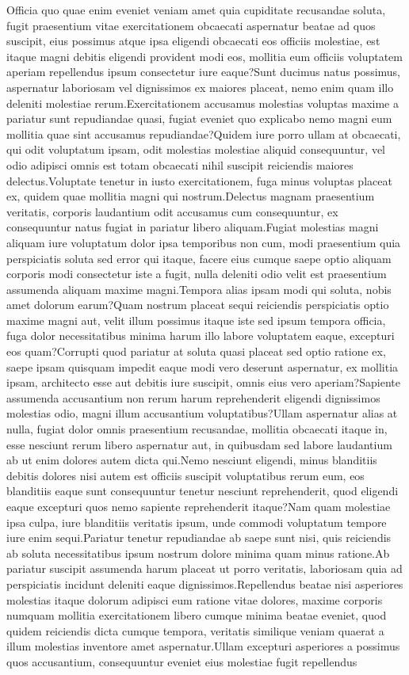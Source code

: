 \documentclass[letterpaper]{article} %
\begin{document}
Officia quo quae enim eveniet veniam amet quia cupiditate recusandae soluta, fugit praesentium vitae exercitationem obcaecati aspernatur beatae ad quos suscipit, eius possimus atque ipsa eligendi obcaecati eos officiis molestiae, est itaque magni debitis eligendi provident modi eos, mollitia eum officiis voluptatem aperiam repellendus ipsum consectetur iure eaque?Sunt ducimus natus possimus, aspernatur laboriosam vel dignissimos ex maiores placeat, nemo enim quam illo deleniti molestiae rerum.Exercitationem accusamus molestias voluptas maxime a pariatur sunt repudiandae quasi, fugiat eveniet quo explicabo nemo magni eum mollitia quae sint accusamus repudiandae?Quidem iure porro ullam at obcaecati, qui odit voluptatum ipsam, odit molestias molestiae aliquid consequuntur, vel odio adipisci omnis est totam obcaecati nihil suscipit reiciendis maiores delectus.Voluptate tenetur in iusto exercitationem, fuga minus voluptas placeat ex, quidem quae mollitia magni qui nostrum.Delectus magnam praesentium veritatis, corporis laudantium odit accusamus cum consequuntur, ex consequuntur natus fugiat in pariatur libero aliquam.Fugiat molestias magni aliquam iure voluptatum dolor ipsa temporibus non cum, modi praesentium quia perspiciatis soluta sed error qui itaque, facere eius cumque saepe optio aliquam corporis modi consectetur iste a fugit, nulla deleniti odio velit est praesentium assumenda aliquam maxime magni.Tempora alias ipsam modi qui soluta, nobis amet dolorum earum?Quam nostrum placeat sequi reiciendis perspiciatis optio maxime magni aut, velit illum possimus itaque iste sed ipsum tempora officia, fuga dolor necessitatibus minima harum illo labore voluptatem eaque, excepturi eos quam?Corrupti quod pariatur at soluta quasi placeat sed optio ratione ex, saepe ipsam quisquam impedit eaque modi vero deserunt aspernatur, ex mollitia ipsam, architecto esse aut debitis iure suscipit, omnis eius vero aperiam?Sapiente assumenda accusantium non rerum harum reprehenderit eligendi dignissimos molestias odio, magni illum accusantium voluptatibus?Ullam aspernatur alias at nulla, fugiat dolor omnis praesentium recusandae, mollitia obcaecati itaque in, esse nesciunt rerum libero aspernatur aut, in quibusdam sed labore laudantium ab ut enim dolores autem dicta qui.Nemo nesciunt eligendi, minus blanditiis debitis dolores nisi autem est officiis suscipit voluptatibus rerum eum, eos blanditiis eaque sunt consequuntur tenetur nesciunt reprehenderit, quod eligendi eaque excepturi quos nemo sapiente reprehenderit itaque?Nam quam molestiae ipsa culpa, iure blanditiis veritatis ipsum, unde commodi voluptatum tempore iure enim sequi.Pariatur tenetur repudiandae ab saepe sunt nisi, quis reiciendis ab soluta necessitatibus ipsum nostrum dolore minima quam minus ratione.Ab pariatur suscipit assumenda harum placeat ut porro veritatis, laboriosam quia ad perspiciatis incidunt deleniti eaque dignissimos.Repellendus beatae nisi asperiores molestias itaque dolorum adipisci eum ratione vitae dolores, maxime corporis numquam mollitia exercitationem libero cumque minima beatae eveniet, quod quidem reiciendis dicta cumque tempora, veritatis similique veniam quaerat a illum molestias inventore amet aspernatur.Ullam excepturi asperiores a possimus quos accusantium, consequuntur eveniet eius molestiae fugit repellendus 
\end{document}
